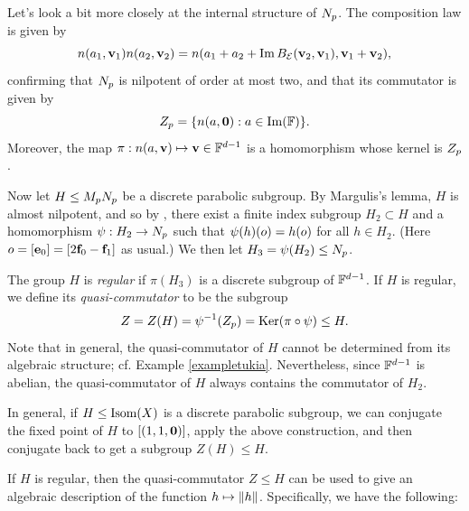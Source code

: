 {Let's look a bit more closely at the internal structure of $N_p$. The composition law is given by
\begin{equation}
\label{compositionlaw}
n(a_1,\mathbf v_1) n(a_2,\mathbf v_2) = n(a_1 + a_2 + \operatorname{Im} B_\mathcal E(\mathbf v_2,\mathbf v_1),\mathbf v_1 + \mathbf v_2),
\end{equation}
confirming that $N_p$ is nilpotent of order at most two, and that its commutator is given by
\[
Z_\bp = \{n(a,\0) : a\in\Im(\F)\}.
\]
Moreover, the map $\pi:n(a,\vv)\mapsto \vv\in \F^{d - 1}$ is a homomorphism whose kernel is $Z_p$.

Now let $H\leq M_p N_p$ be a discrete parabolic subgroup. By Margulis's lemma, $H$ is almost nilpotent, and so by \cite[Lemma 3.4]{CorletteIozzi}, there exist a finite index subgroup $H_2\subset H$ and a homomorphism $\psi:H_2\to N_p$ such that $\psi(h)(o) = h(o)$ for all $h\in H_2$. (Here $o = [\mathbf e_0] = [2\mathbf f_0 - \mathbf f_1]$ as usual.) We then let $H_3 = \psi(H_2) \leq N_p$.
\begin{definition}
\label{definitionHregular}
The group $H$ is \emph{regular} if $\pi(H_3)$ is a discrete subgroup of $\F^{d - 1}$. If $H$ is regular, we define its \emph{quasi-commutator} to be the subgroup
\[
Z = Z(H) = \psi^{-1}(Z_p) = \operatorname{Ker}(\pi\circ\psi) \leq H.
\]
Note that in general, the quasi-commutator of $H$ cannot be determined from its algebraic structure; cf. Example \ref{exampletukia}. Nevertheless, since $\F^{d - 1}$ is abelian, the quasi-commutator of $H$ always contains the commutator of $H_2$.
\end{definition}

In general, if $H\leq\operatorname{Isom}(X)$ is a discrete parabolic subgroup, we can conjugate the fixed point of $H$ to $[(1,1,\mathbf 0)]$, apply the above construction, and then conjugate back to get a subgroup $Z(H)\leq H$.

If $H$ is regular, then the quasi-commutator $Z\leq H$ can be used to give an algebraic description of the function $h\mapsto \|h\|$. Specifically, we have the following:


}
